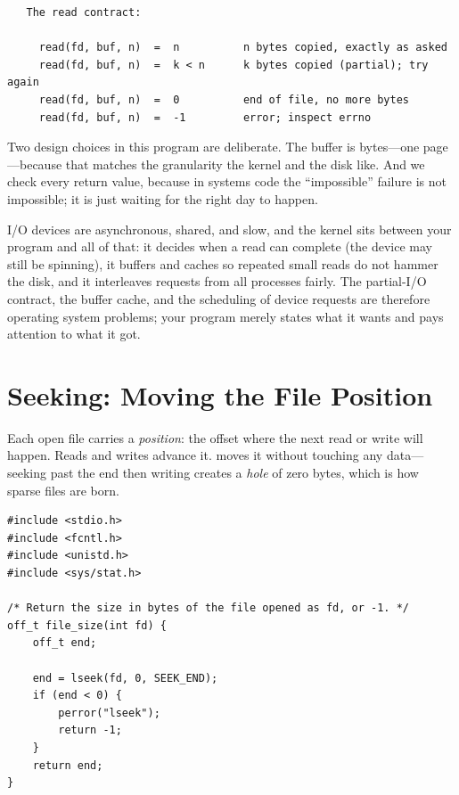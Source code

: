 \begin{verbatim}
   The read contract:

     read(fd, buf, n)  =  n          n bytes copied, exactly as asked
     read(fd, buf, n)  =  k < n      k bytes copied (partial); try again
     read(fd, buf, n)  =  0          end of file, no more bytes
     read(fd, buf, n)  =  -1         error; inspect errno
\end{verbatim}

Two design choices in this program are deliberate. The buffer is
 bytes---one page---because that matches the granularity the
kernel and the disk like. And we check every return value, because in
systems code the ``impossible'' failure is not impossible; it is just
waiting for the right day to happen.

\begin{osconcept}
I/O devices are asynchronous, shared, and slow, and the kernel sits
between your program and all of that: it decides when a read can
complete (the device may still be spinning), it buffers and caches so
repeated small reads do not hammer the disk, and it interleaves
requests from all processes fairly. The partial-I/O contract, the
buffer cache, and the scheduling of device requests are therefore
operating system problems; your program merely states what it wants and
pays attention to what it got.
\end{osconcept}

\section{Seeking: Moving the File Position}

Each open file carries a \emph{position}: the offset where the next
read or write will happen. Reads and writes advance it. 
moves it without touching any data---seeking past the end then writing
creates a \emph{hole} of zero bytes, which is how sparse files are born.

\begin{lstlisting}[caption={Finding a file's size by seeking to its end.}]
#include <stdio.h>
#include <fcntl.h>
#include <unistd.h>
#include <sys/stat.h>

/* Return the size in bytes of the file opened as fd, or -1. */
off_t file_size(int fd) {
    off_t end;

    end = lseek(fd, 0, SEEK_END);
    if (end < 0) {
        perror("lseek");
        return -1;
    }
    return end;
}
\end{lstlisting}

